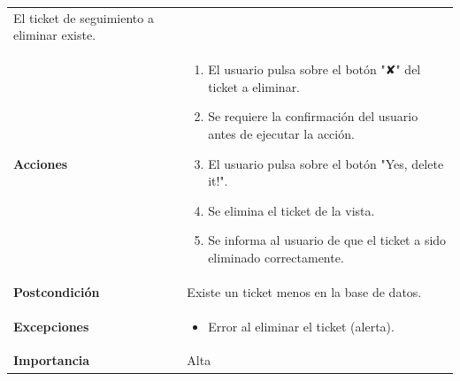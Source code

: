 \documentclass[
]{article}
\providecommand{\tightlist}{%
  \setlength{\itemsep}{0pt}\setlength{\parskip}{0pt}}
\begin{document}
\begin{longtable}[]{@{}ll@{}}
\begin{minipage}[t]{0.70\columnwidth}
El ticket de seguimiento a eliminar existe.\strut
\end{minipage}\tabularnewline
\begin{minipage}[t]{0.24\columnwidth}\raggedright
\textbf{Acciones}\strut
\end{minipage} & \begin{minipage}[t]{0.70\columnwidth}\raggedright
\begin{enumerate}
\def\labelenumi{\arabic{enumi}.}
\tightlist
\item
  El usuario pulsa sobre el botón "✘" del ticket a eliminar.
\item
  Se requiere la confirmación del usuario antes de ejecutar la acción.
\item
  El usuario pulsa sobre el botón "Yes, delete it!".
\item
  Se elimina el ticket de la vista.
\item
  Se informa al usuario de que el ticket a sido eliminado correctamente.
\end{enumerate}\strut
\end{minipage}\tabularnewline
\begin{minipage}[t]{0.24\columnwidth}\raggedright
\textbf{Postcondición}\strut
\end{minipage} & \begin{minipage}[t]{0.70\columnwidth}\raggedright
Existe un ticket menos en la base de datos.\strut
\end{minipage}\tabularnewline
\begin{minipage}[t]{0.24\columnwidth}\raggedright
\textbf{Excepciones}\strut
\end{minipage} & \begin{minipage}[t]{0.70\columnwidth}\raggedright
\begin{itemize}
\tightlist
\item
  Error al eliminar el ticket (alerta).
\end{itemize}\strut
\end{minipage}\tabularnewline
\begin{minipage}[t]{0.24\columnwidth}\raggedright
\textbf{Importancia}\strut
\end{minipage} & \begin{minipage}[t]{0.70\columnwidth}\raggedright
Alta\strut
\end{minipage}\tabularnewline
\bottomrule
\end{longtable}
\end{document}
